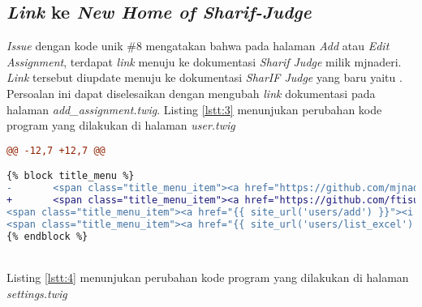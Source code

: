	\subsection{\textit{Link} ke \textit{New Home of Sharif-Judge}}
	\textit{Issue} dengan kode unik \#8 mengatakan bahwa pada halaman \textit{Add} atau \textit{Edit Assignment}, terdapat \textit{link} menuju ke dokumentasi \textit{Sharif Judge} milik mjnaderi. \textit{Link} tersebut diupdate menuju ke dokumentasi \textit{SharIF Judge} yang baru yaitu . Persoalan ini dapat diselesaikan dengan mengubah \textit{link} dokumentasi pada halaman \textit{add\_assignment.twig}. Listing \ref{lstt:3} menunjukan perubahan kode program yang dilakukan di halaman \textit{user.twig}
	
\begin{lstlisting}[language=diff, caption=Perubahan kode program pada halaman \textit{user.twig}, label=lstt:3, basicstyle=\ttfamily, frame=single,
columns=fullflexible, keepspaces=true, breaklines=true]
@@ -12,7 +12,7 @@

{% block title_menu %}
-       <span class="title_menu_item"><a href="https://github.com/mjnaderi/Sharif-Judge/blob/docs/v1.4/users.md" target="_blank"><i class="fa fa-question-circle color6"></i> Help</a></span>
+       <span class="title_menu_item"><a href="https://github.com/ftisunpar/Sharif-Judge/blob/docs/v1.4/users.md" target="_blank"><i class="fa fa-question-circle color6"></i> Help</a></span>
<span class="title_menu_item"><a href="{{ site_url('users/add') }}"><i class="fa fa-plus color11"></i> Add Users</a></span>
<span class="title_menu_item"><a href="{{ site_url('users/list_excel') }}"><i class="fa fa-download color9"></i> Excel</a></span>
{% endblock %}
\end{lstlisting}
~\\	
	Listing \ref{lstt:4} menunjukan perubahan kode program yang dilakukan di halaman \textit{settings.twig}
